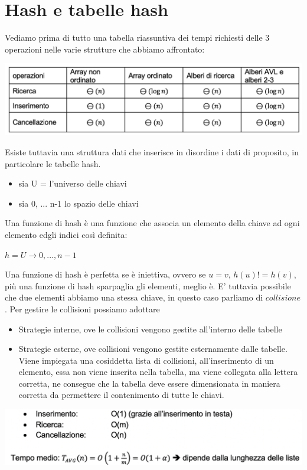 \documentclass[11pt, oneside]{article}   	%
\begin{document}
\section*{Hash e tabelle hash}
Vediamo prima di tutto una tabella riassuntiva dei tempi richiesti delle 3 operazioni nelle varie strutture che abbiamo affrontato:
\begin{center}
\includegraphics[scale=0.6]{h1}
\end{center}
Esiste tuttavia una struttura dati che inserisce in disordine i dati di proposito, in particolare le tabelle hash.\begin{itemize}
\item sia U = l'universo delle chiavi
\item sia {0, ... n-1} lo spazio delle chiavi
\end{itemize}
Una funzione di hash è una funzione che associa un elemento della chiave ad ogni elemento edgli indici così definita:
\begin{center}
$h = U \rightarrow{0, ... ,n-1}$
\end{center}
Una funzione di hash è perfetta se è iniettiva, ovvero se $u = v$, $h(u) != h(v)$, più una funzione di hash sparpaglia gli elementi, meglio è. E' tuttavia possibile che due elementi abbiamo una stessa chiave, in questo caso parliamo di $collisione$. 
Per gestire le collisioni possiamo adottare
\begin{itemize}
\item Strategie interne, ove le collisioni vengono gestite all’interno delle tabelle
\item Strategie esterne, ove collisioni vengono gestite esternamente dalle tabelle.\\
Viene impiegata una cosiddetta lista di collisioni, all’inserimento di un elemento, essa non viene inserita nella tabella, ma viene collegata alla lettera corretta, ne consegue che la tabella deve essere dimensionata in maniera corretta da permettere il contenimento di tutte le chiavi.
\end{itemize}
\begin{center}
\includegraphics[scale=0.6]{h2}
\end{center}
\end{document}
